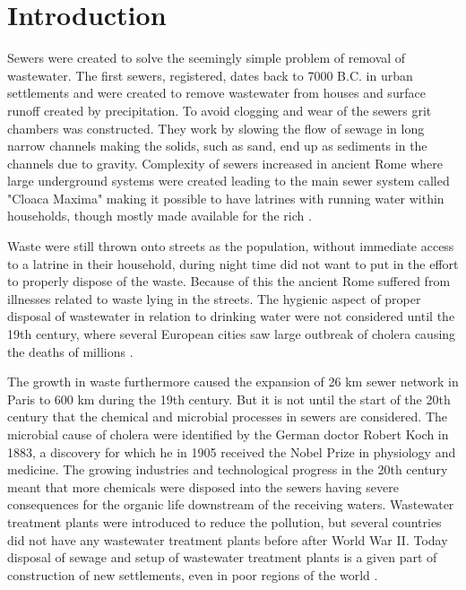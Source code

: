 \chapter{Introduction}
\label{ch:introduction}

Sewers were created to solve the seemingly simple problem of removal of wastewater. The first sewers, registered, dates back to 7000 B.C. in urban settlements and were created to remove wastewater from houses and surface runoff created by precipitation. To avoid clogging and wear of the sewers grit chambers was constructed. They work by slowing the flow of sewage in long narrow channels making the solids, such as sand, end up as sediments in the channels due to gravity. Complexity of sewers increased in ancient Rome where large underground systems were created leading to the main sewer system called "Cloaca Maxima" making it possible to have latrines with running water within households, though mostly made available for the rich \cite{Sewer_processes}.

Waste were still thrown onto streets as the population, without immediate access to a latrine in their household, during night time did not want to put in the effort to properly dispose of the waste. Because of this the ancient Rome suffered from illnesses related to waste lying in the streets. The hygienic aspect of proper disposal of wastewater in relation to drinking water were not considered until the 19th century, where several European cities saw large outbreak of cholera causing the deaths of millions \cite{Sewer_processes}. 

The growth in waste furthermore caused the expansion of 26 km sewer network in Paris to 600 km during the 19th century. But it is not until the start of the 20th century that the chemical and microbial processes in sewers are considered. The microbial cause of cholera were identified by the German doctor Robert Koch in 1883, a discovery for which he in 1905 received the Nobel Prize in physiology and medicine. The growing industries and technological progress in the 20th century meant that more chemicals were disposed into the sewers having severe consequences for the organic life downstream of the receiving waters. Wastewater treatment plants were introduced to reduce the pollution, but several countries did not have any wastewater treatment plants before after World War II. Today disposal of sewage and setup of wastewater treatment plants is a given part of construction of new settlements, even in poor regions of the world \cite{Sewer_processes}.


